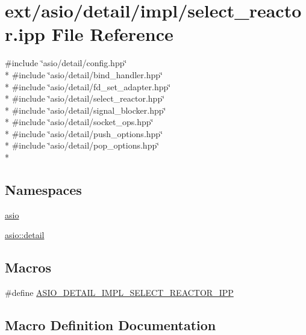 \hypertarget{select__reactor_8ipp}{}\section{ext/asio/detail/impl/select\+\_\+reactor.ipp File Reference}
\label{select__reactor_8ipp}
{\ttfamily \#include \char`\"{}asio/detail/config.\+hpp\char`\"{}}\\*
{\ttfamily \#include \char`\"{}asio/detail/bind\+\_\+handler.\+hpp\char`\"{}}\\*
{\ttfamily \#include \char`\"{}asio/detail/fd\+\_\+set\+\_\+adapter.\+hpp\char`\"{}}\\*
{\ttfamily \#include \char`\"{}asio/detail/select\+\_\+reactor.\+hpp\char`\"{}}\\*
{\ttfamily \#include \char`\"{}asio/detail/signal\+\_\+blocker.\+hpp\char`\"{}}\\*
{\ttfamily \#include \char`\"{}asio/detail/socket\+\_\+ops.\+hpp\char`\"{}}\\*
{\ttfamily \#include \char`\"{}asio/detail/push\+\_\+options.\+hpp\char`\"{}}\\*
{\ttfamily \#include \char`\"{}asio/detail/pop\+\_\+options.\+hpp\char`\"{}}\\*
\subsection*{Namespaces}
\begin{DoxyCompactItemize}
\item 
 \hyperlink{namespaceasio}{asio}
\item 
 \hyperlink{namespaceasio_1_1detail}{asio\+::detail}
\end{DoxyCompactItemize}
\subsection*{Macros}
\begin{DoxyCompactItemize}
\item 
\#define \hyperlink{select__reactor_8ipp_ad306e7b7be0d91621e346df74f959745}{A\+S\+I\+O\+\_\+\+D\+E\+T\+A\+I\+L\+\_\+\+I\+M\+P\+L\+\_\+\+S\+E\+L\+E\+C\+T\+\_\+\+R\+E\+A\+C\+T\+O\+R\+\_\+\+I\+P\+P}
\end{DoxyCompactItemize}


\subsection{Macro Definition Documentation}
\hypertarget{select__reactor_8ipp_ad306e7b7be0d91621e346df74f959745}{}
